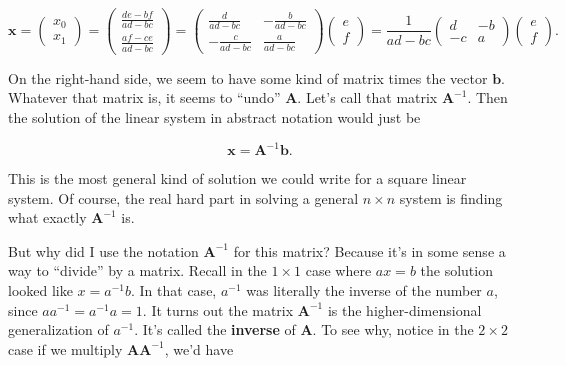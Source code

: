 \documentclass[
  letterpaper,
  DIV=11,
  numbers=noendperiod]{scrreprt}
\begin{document}
\[
\mathbf{x} = 
\begin{pmatrix}
x_0 \\
x_1
\end{pmatrix} =
\begin{pmatrix}
\frac{de-bf}{ad-bc} \\
\frac{af-ce}{ad-bc}
\end{pmatrix} =
\begin{pmatrix}
\frac{d}{ad-bc} & -\frac{b}{ad-bc} \\
-\frac{c}{ad-bc} & \frac{a}{ad-bc}
\end{pmatrix}
\begin{pmatrix}
e \\
f
\end{pmatrix} = 
\frac{1}{ad-bc}
\begin{pmatrix}
d & -b \\
-c & a
\end{pmatrix}
\begin{pmatrix}
e \\
f
\end{pmatrix}.
\]

On the right-hand side, we seem to have some kind of matrix times the
vector \(\mathbf{b}\). Whatever that matrix is, it seems to ``undo''
\(\mathbf{A}\). Let's call that matrix \(\mathbf{A}^{-1}\). Then the
solution of the linear system in abstract notation would just be

\[\mathbf{x} = \mathbf{A}^{-1} \mathbf{b}.\]

This is the most general kind of solution we could write for a square
linear system. Of course, the real hard part in solving a general
\(n \times n\) system is finding what exactly \(\mathbf{A}^{-1}\) is.

But why did I use the notation \(\mathbf{A}^{-1}\) for this matrix?
Because it's in some sense a way to ``divide'' by a matrix. Recall in
the \(1 \times 1\) case where \(ax=b\) the solution looked like
\(x=a^{-1}b\). In that case, \(a^{-1}\) was literally the inverse of the
number \(a\), since \(aa^{-1} = a^{-1}a = 1\). It turns out the matrix
\(\mathbf{A}^{-1}\) is the higher-dimensional generalization of
\(a^{-1}\). It's called the \textbf{inverse} of \(\mathbf{A}\). To see
why, notice in the \(2 \times 2\) case if we multiply
\(\mathbf{A}\mathbf{A}^{-1}\), we'd have
\end{document}
